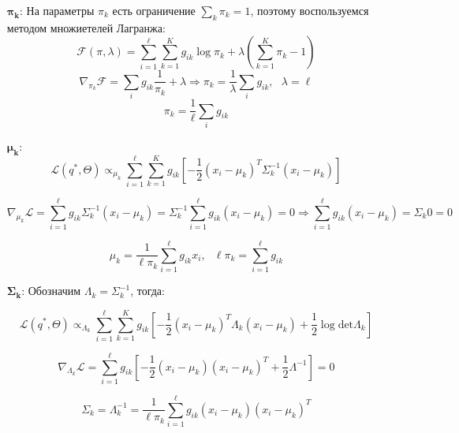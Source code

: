 \documentclass[12pt,a4paper]{article}
\begin{document}
\begin{itemize}
    \item [$\mathbf{\pi_k}$:] На параметры $\pi_k$ есть ограничение $\sum_k \pi_k = 1$, поэтому воспользуемся методом множиетелей Лагранжа:
    \begin{equation*}
        \mathcal{F}(\pi, \lambda) = \sum_{i = 1}^{\ell} \sum_{k = 1}^{K} g_{ik} \log \pi_k + \lambda \left(\sum_{k=1}^K \pi_k - 1\right)
    \end{equation*}
    \begin{equation*}
        \nabla_{\pi_k} \mathcal{F} = \sum_i g_{ik} \dfrac{1}{\pi_k} + \lambda \Rightarrow \pi_k = \dfrac{1}{\lambda} \sum_i g_{ik}, ~~~ \lambda = \ell
    \end{equation*}
    \begin{equation*}
        \pi_k = \dfrac{1}{\ell} \sum_i g_{ik}
    \end{equation*}
    
    \item [$\mathbf{\mu_k}$:] 
    \begin{equation*}
        \mathcal{L}(q^*, \Theta) \propto_{\mu_k} \sum_{i = 1}^{\ell} \sum_{k = 1}^{K} g_{ik} \left[ -\dfrac{1}{2}(x_i - \mu_k)^T \Sigma^{-1}_k (x_i - \mu_k) \right]
    \end{equation*}
    
    \begin{equation*}
        \nabla_{\mu_k} \mathcal{L} = \sum_{i = 1}^{\ell} g_{ik} \Sigma_k^{-1} (x_i - \mu_k) = \Sigma_k^{-1} \sum_{i = 1}^{\ell} g_{ik} (x_i - \mu_k) = 0 \Rightarrow \sum_{i = 1}^{\ell} g_{ik} (x_i - \mu_k) = \Sigma_{k} 0 = 0
    \end{equation*}
    
    \begin{equation*}
        \mu_k = \dfrac{1}{\ell \pi_k} \sum_{i = 1}^{\ell} g_{ik} x_i, ~~~ \ell \pi_k = \sum_{i=1}^{\ell} g_{ik}
    \end{equation*}
    
    \item[$\mathbf{\Sigma_k}$:] Обозначим $\Lambda_k = \Sigma_k^{-1}$, тогда:
    
    \begin{equation*}
    \mathcal{L}(q^*, \Theta) \propto_{\Lambda_k} \sum_{i = 1}^{\ell} \sum_{k = 1}^{K} g_{ik} \left[ -\dfrac{1}{2}(x_i - \mu_k)^T \Lambda_k (x_i - \mu_k) + \dfrac{1}{2} \log \text{det} \Lambda_k \right]
    \end{equation*}

    \begin{equation*}
        \nabla_{\Lambda_k} \mathcal{L} = \sum_{i = 1}^{\ell} g_{ik} \left[- \dfrac{1}{2} (x_i - \mu_k) (x_i - \mu_k)^T + \dfrac{1}{2} \Lambda^{-1} \right] = 0
    \end{equation*}
    
    \begin{equation*}
        \Sigma_k = \Lambda^{-1}_k = \dfrac{1}{\ell \pi_k} \sum_{i = 1}^{\ell} g_{ik} (x_i - \mu_k) (x_i - \mu_k)^T
    \end{equation*}

\end{itemize}
\end{document}

